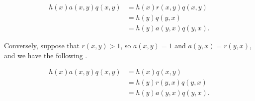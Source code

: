 \documentclass[../../../main.tex]{subfiles}
\begin{document}
\begin{align*}
h(x)a(x,y)q(x,y) &= h(x)r(x,y)q(x,y) \\
&= h(y)q(y,x) \\
&= h(y)a(y,x)q(y,x).
\end{align*}

Conversely, suppose that $r(x,y)>1$, so $a(x,y)=1$ and $a(y,x)=r(y,x)$, and we have the following \autocite{Brooks2011}.

\begin{align*}
h(x)a(x,y)q(x,y) &= h(x)q(x,y) \\
&= h(y)r(y,x)q(y,x) \\
&= h(y)a(y,x)q(y,x).
\end{align*}
\end{document}
